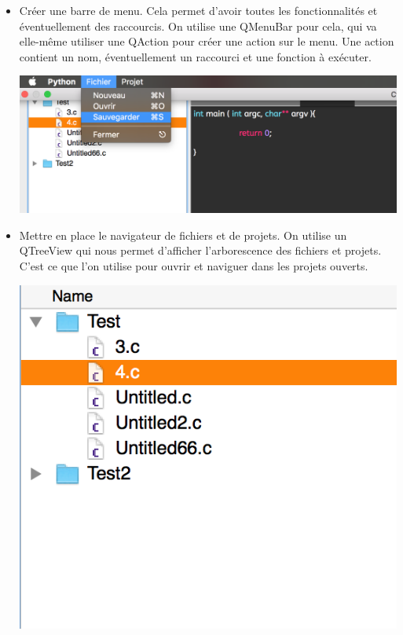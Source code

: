\documentclass[a4paper,12pt]{article}
\begin{document}
\begin{itemize}
			\item Créer une barre de menu. Cela permet d'avoir toutes les fonctionnalités et éventuellement des raccourcis. On utilise une QMenuBar pour cela, qui va elle-même utiliser une QAction pour créer une action sur le menu. Une action contient un nom, éventuellement un raccourci et une fonction à exécuter. 
			\begin{center}
				\includegraphics[scale=0.6]{images/QMenuBar}
				\vspace{0.5cm}
			\end{center}
			
			\item Mettre en place le navigateur de fichiers et de projets. On utilise un QTreeView qui nous permet d'afficher l'arborescence des fichiers et projets. C'est ce que l'on utilise pour ouvrir et naviguer dans les projets ouverts.\\
			\begin{center}
				\includegraphics[scale=0.6]{images/QTreeView}
				\vspace{0.6cm}
			\end{center}
			

\end{itemize}
\end{document}
